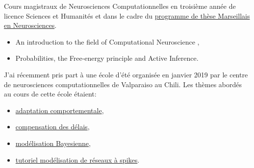 \documentclass[10pt,french,a4paper,oneside]{article}%
\newcommand{\years}[1]{\marginpar{\textit{\scriptsize #1}}}
\begin{document}
Cours magistraux de Neurosciences Computationnelles en  troisième année de licence Sciences et Humanités\years{2019} et dans le cadre du  \href{https://laurentperrinet.github.io/post/2018-03-26-cours-neuro-comp-fep/}{programme de thèse Marseillais en Neurosciences}\years{2018}.

\begin{itemize}
	\item An introduction to the field of Computational Neuroscience ,
	\item Probabilities, the Free-energy principle and Active Inference.
\end{itemize}


J'ai récemment pris part à une école d'été organisée en janvier 2019 par le centre de neurosciences computationnelles de Valparaiso au Chili. Les thèmes abordés au cours de cette école étaient:
\begin{itemize}
	\item \href{https://laurentperrinet.github.io/talk/2019-01-18-laconeu/}{adaptation comportementale},
	\item \href{https://laurentperrinet.github.io/talk/2019-01-17-laconeu/}{compensation des délais},
	\item \href{https://laurentperrinet.github.io/talk/2019-01-16-laconeu/}{modélisation Bayesienne},
	\item \href{https://laurentperrinet.github.io/talk/2019-01-14-laconeu/}{tutoriel modélisation de réseaux à spikes}.

\end{itemize}


%
%
%
%
\end{document}
